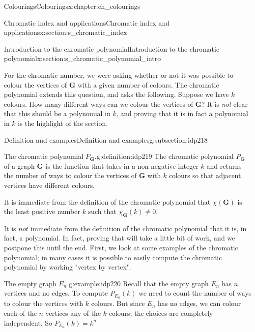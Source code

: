 \documentclass[oneside,10pt,]{book}
\numberwithin{equation}{section}
\newcommand{\bfG}{\mathbf{G}}
\begin{document}
\begin{chapterptx}{Colourings}{}{Colourings}{}{}{x:chapter:ch_colourings}
\begin{sectionptx}{Chromatic index and applications}{}{Chromatic index and applications}{}{}{x:section:s_chromatic_index}
\end{sectionptx}
%
%
\typeout{************************************************}
\typeout{************************************************}
%
\begin{sectionptx}{Introduction to the chromatic polynomial}{}{Introduction to the chromatic polynomial}{}{}{x:section:s_chromatic_polynomial_intro}
\begin{introduction}{}%
For the chromatic number, we were asking whether or not it was possible to colour the vertices of \(\bfG\) with a given number of colours.  The chromatic polynomial extends this question, and asks the following.  Suppose we have \(k\) colours.  How many different ways can we colour the vertices of \(\bfG\)?  It is \emph{not} clear that this should be a polynomial in \(k\), and proving that it is in fact a polynomial in \(k\) is the highlight of the section.%
\end{introduction}%
%
%
\typeout{************************************************}
\typeout{************************************************}
%
\begin{subsectionptx}{Definition and examples}{}{Definition and examples}{}{}{g:subsection:idp218}
\begin{definition}{The chromatic polynomial \(P_{\bfG}\).}{g:definition:idp219}%
The chromatic polynomial \(P_{\bfG}\) of a graph \(\bfG\) is the function that takes in a non-negative integer \(k\) and returns the number of ways to colour the vertices of \(\bfG\) with \(k\) colours so that adjacent vertices have different colours.%
\end{definition}
It is immediate from the definition of the chromatic polynomial that \(\chi(\bfG)\) is the least positive number \(k\) such that \(\chi_{\bfG}(k)\neq 0\).%
\par
It is \(not\) immediate from the definition of the chromatic polynomial that it is, in fact, a polynomial.  In fact, proving that will take a little bit of work, and we postpone this until the end.  First, we look at some examples of the chromatic polynomial; in many cases it is possible to easily compute the chromatic polynomial by working "vertex by vertex".%
\begin{example}{The empty graph \(E_n\).}{g:example:idp220}%
Recall that the empty graph \(E_n\) has \(n\) vertices and no edges.  To compute \(P_{E_n}(k)\) we need to count the number of ways to colour the vertices with \(k\) colours.  But since \(E_n\) has no edges, we can colour each of the \(n\) vertices any of the \(k\) colours; the choices are completely independent.  So \(P_{E_n}(k)=k^n\)%

\end{example}
\end{subsectionptx}
\end{sectionptx}
\end{chapterptx}
\end{document}
